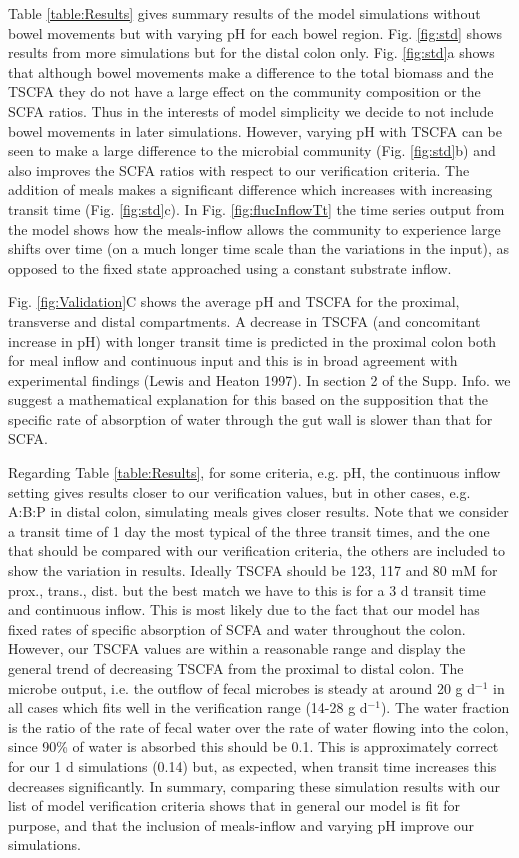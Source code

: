 \documentclass[a4paper]{article}
\begin{document}
Table \ref{table:Results} gives summary results of the model simulations without bowel movements but with varying pH for each bowel region. Fig. \ref{fig:std} shows results from more simulations but for the distal colon only.
Fig. \ref{fig:std}a shows that although bowel movements make a difference to the total biomass and the TSCFA they do not have a large effect on the community composition or the SCFA ratios. Thus in the interests of model simplicity we decide to not include bowel movements in later simulations.
However, varying pH with TSCFA can be seen to make a large difference to the microbial community (Fig. \ref{fig:std}b) and also improves the SCFA ratios with respect to our verification criteria.
The addition of meals makes a significant difference which increases with increasing transit time (Fig. \ref{fig:std}c). 
In Fig. \ref{fig:flucInflowTt} the time series output from the model shows how the meals-inflow allows the community to experience large shifts over time (on a much longer time scale than the variations in the input), as opposed to the fixed state approached using a constant substrate inflow.

Fig. \ref{fig:Validation}C shows the average pH and TSCFA for the proximal, transverse and distal compartments. 
A decrease in TSCFA (and concomitant increase in pH) with longer transit time is predicted in the proximal colon both for meal inflow and continuous input and this is in broad agreement with experimental findings (Lewis and Heaton 1997). In section 2 of the Supp. Info. we suggest a mathematical explanation for this based on the supposition that the specific rate of absorption of water through the gut wall is slower than that for SCFA.


Regarding Table \ref{table:Results}, for some criteria, e.g. pH, the continuous inflow setting gives results closer to our verification values, but in other cases, e.g. A:B:P in distal colon, simulating meals gives closer results. 
Note that we consider a transit time of 1 day the most typical of the three transit times, and the one that should be compared with our verification criteria, the others are included to show the variation in results.
Ideally TSCFA should be 123, 117 and 80 mM for prox., trans., dist. but the best match we have to this is for a 3 d transit time and continuous inflow. 
This is most likely due to the fact that our model has fixed rates of specific absorption of SCFA and water throughout the colon.
However, our TSCFA values are within a reasonable range and display the general trend of decreasing TSCFA from the proximal to distal colon.
The microbe output, i.e. the outflow of fecal microbes is steady at around 20 g d$^{-1}$ in all cases which fits well in the verification range (14-28 g d$^{-1}$).
The water fraction is the ratio of the rate of fecal water over the rate of water flowing into the colon, since 90\% of water is absorbed this should be 0.1. This is approximately correct for our 1 d simulations (0.14) but, as expected, when transit time increases this decreases significantly.
In summary, comparing these simulation results with our list of model verification criteria shows that in general our model is fit for purpose, and that the inclusion of meals-inflow and varying pH improve our simulations. 
\end{document}
